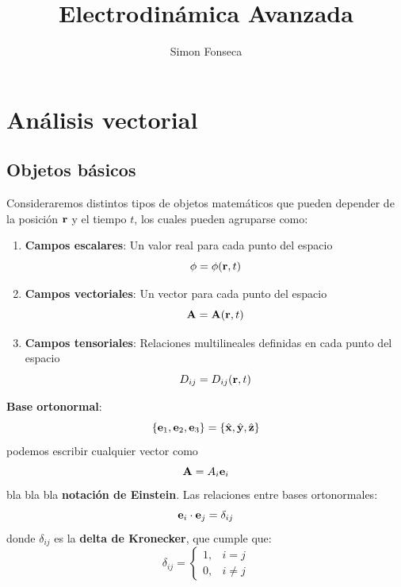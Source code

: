 \documentclass[]{article}
\title{Electrodinámica Avanzada}
\author{Simon Fonseca}
\numberwithin{equation}{section}
\begin{document}
\maketitle

\section{Análisis vectorial}

\subsection{Objetos básicos}
Consideraremos distintos tipos de objetos matemáticos que pueden depender de la posición \(\mathbf{r}\) y el tiempo \(t\), los cuales pueden agruparse como:
\begin{enumerate}
	\item \textbf{Campos escalares}: Un valor real para cada punto del espacio
	\begin{equation}
		\phi = \phi(\mathbf{r},t)
		\label{campo_escalar}
	\end{equation}
	\item \textbf{Campos vectoriales}: Un vector para cada punto del espacio
	\begin{equation}
		\mathbf{A} = \mathbf{A}(\mathbf{r},t)
		\label{campo_vectorial}
	\end{equation}
	\item \textbf{Campos tensoriales}: Relaciones multilineales definidas en cada punto del espacio
	\begin{equation}
	D_{ij} = D_{ij}(\mathbf{r},t)
	\label{campo_tensorial}
	\end{equation}
\end{enumerate}

\textbf{Base ortonormal}:
\begin{equation}
	\{\mathbf{e}_1,\mathbf{e}_2,\mathbf{e}_3\} = \{\hat{\mathbf{x}},\hat{\mathbf{y}},\hat{\mathbf{z}}\}
	\label{base_ortonormal}
\end{equation}
podemos escribir cualquier vector como
\begin{equation}
	\mathbf{A} = A_i \mathbf{e}_i
\end{equation}
bla bla bla \textbf{notación de Einstein}. Las relaciones entre bases ortonormales:
\begin{equation}
	\mathbf{e}_i\cdot\mathbf{e}_j = \delta_{ij}
\end{equation}
donde \(\delta_{ij}\) es la \textbf{delta de Kronecker}, que cumple que:
\begin{equation}
	\delta_{ij} = \left\lbrace \begin{matrix}
		1,& i = j\\
		0,& i\neq j
	\end{matrix}\right. 
\end{equation}
\end{document}
